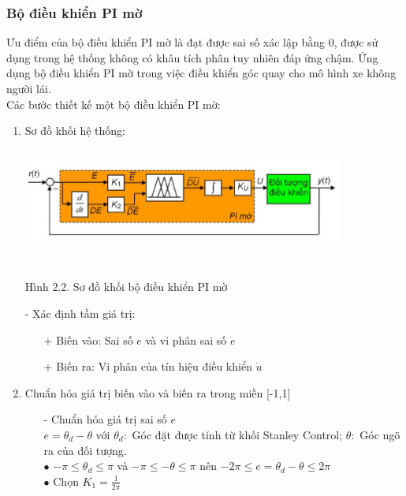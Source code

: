\documentclass[a4paper, 12pt]{article}
\begin{document}
	\subsubsection{Bộ điều khiển PI mờ}
	\hspace{0.5cm}
	Ưu điểm của bộ điều khiển PI mờ là đạt được sai số xác lập bằng 0, được sử dụng trong hệ thống không có khâu tích phân tuy nhiên đáp ứng chậm. Ứng dụng bộ điều khiển PI mờ trong việc điều khiển góc quay cho mô hình xe không người lái.\\\indent
	Các bước thiết kế một bộ điều khiển PI mờ:\\
	\begin{enumerate}
		\item Sơ đồ khối hệ thống:\\
		\includegraphics[width=400px,height=160px]{images/BDKPI}\\
		\begin{center}
			Hình 2.2. Sơ đồ khối bộ điều khiển PI mờ\\
		\end{center}
		\newpage
		- Xác định tầm giá trị:
		\begin{enumerate}
			\item[+] Biến vào: Sai số $e$ và vi phân sai số $\dot{e}$
			\item[+] Biến ra: Vi phân của tín hiệu điều khiển $\dot{u}$
		\end{enumerate}
		\item Chuẩn hóa giá trị biến vào và biến ra trong miền [-1,1]\\
		\begin{enumerate}
			\item[-] Chuẩn hóa giá trị sai số $e$\\\indent
			$ e = \theta_{d} - \theta $ với $ \theta_{d}:$ Góc đặt được tính từ khối Stanley Control; $\theta:$ Góc ngõ ra của đối tượng.\\\indent
			$\bullet$ $-\pi \le \theta_{d} \le \pi$ và $-\pi \le -\theta \le \pi$ nên $-2\pi \le e = \theta_{d} - \theta \le 2\pi$\\\indent
			$\bullet$ Chọn $K_{1} = \frac{1}{2\pi}$

\end{enumerate}
\end{enumerate}
\end{document}
